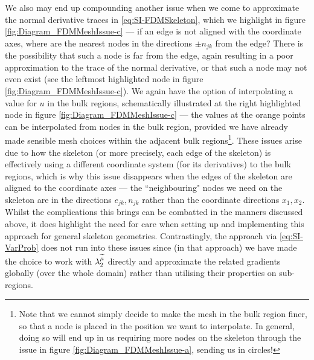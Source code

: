 We also may end up compounding another issue when we come to approximate the normal derivative traces in \eqref{eq:SI-FDMSkeleton}, which we highlight in figure \ref{fig:Diagram_FDMMeshIssue-c} --- if an edge is not aligned with the coordinate axes, where are the nearest nodes in the directions $\pm n_{jk}$ from the edge?
There is the possibility that such a node is far from the edge, again resulting in a poor approximation to the trace of the normal derivative, or that such a node may not even exist (see the leftmost highlighted node in figure \ref{fig:Diagram_FDMMeshIssue-c}).
We again have the option of interpolating a value for $u$ in the bulk regions, schematically illustrated at the right highlighted node in figure \ref{fig:Diagram_FDMMeshIssue-c} --- the values at the orange points can be interpolated from nodes in the bulk region, provided we have already made sensible mesh choices within the adjacent bulk regions\footnote{Note that we cannot simply decide to make the mesh in the bulk region finer, so that a node is placed in the position we want to interpolate. In general, doing so will end up in us requiring more nodes on the skeleton through the issue in figure \ref{fig:Diagram_FDMMeshIssue-a}, sending us in circles!}.
These issues arise due to how the skeleton (or more precisely, each edge of the skeleton) is effectively using a different coordinate system (for its derivatives) to the bulk regions, which is why this issue disappears when the edges of the skeleton are aligned to the coordinate axes --- the ``neighbouring" nodes we need on the skeleton are in the directions $e_{jk}, n_{jk}$ rather than the coordinate directions $x_1, x_2$.
Whilst the complications this brings can be combatted in the manners discussed above, it does highlight the need for care when setting up and implementing this approach for general skeleton geometries.
Contrastingly, the approach via \eqref{eq:SI-VarProb} does not run into these issues since (in that approach) we have made the choice to work with $\lambda_2^{\widetilde{\mu}}$ directly and approximate the related gradients globally (over the whole domain) rather than utilising their properties on sub-regions.